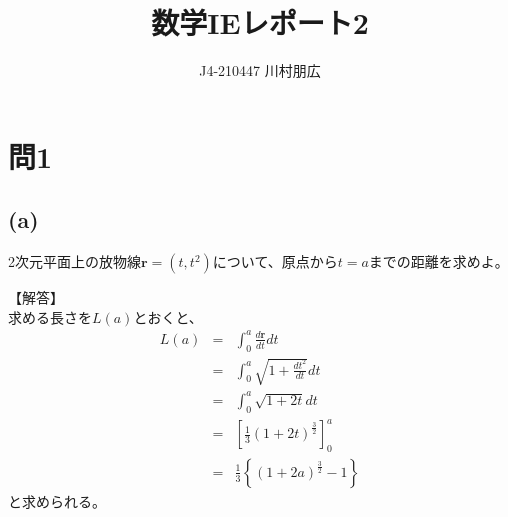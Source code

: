 \documentclass[pdflatex,ja=standard,fleqn]{bxjsarticle}
\title{数学IEレポート2}
\author{J4-210447 川村朋広}
\begin{document}
\maketitle
\section*{問1}
\subsection*{(a)}
\begin{screen}
    2次元平面上の放物線$\boldsymbol{r}=(t,t^2)$について、原点から$t=a$までの距離を求めよ。
\end{screen}
【解答】\\
求める長さを$L(a)$とおくと、
\begin{eqnarray*}
    L(a)&=&\int_{0}^{a} \frac{d\boldsymbol{r}}{dt}dt\\
    &=&\int_{0}^{a} \sqrt{1+\frac{dt^2}{dt}}dt\\
    &=&\int_{0}^{a} \sqrt{1+2t}dt\\
    &=&\left[\frac{1}{3}(1+2t)^{\frac{3}{2}}\right]^a_0\\
    &=&\frac{1}{3} \left\{(1+2a)^{\frac{3}{2}}-1 \right\}
\end{eqnarray*}
と求められる。
\end{document}
